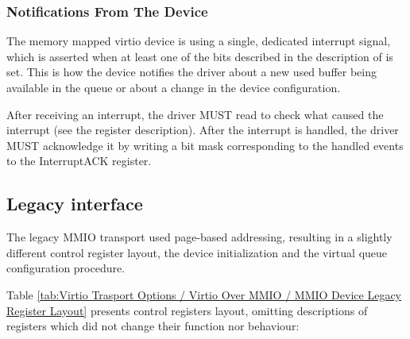 \subsubsection{Notifications From The Device}\label{sec:Virtio Transport Options / Virtio Over MMIO / MMIO-specific Initialization And Device Operation / Notifications From The Device}

The memory mapped virtio device is using a single, dedicated
interrupt signal, which is asserted when at least one of the
bits described in the description of 
is set. This is how the device notifies the
driver about a new used buffer being available in the queue
or about a change in the device configuration.

After receiving an interrupt, the driver MUST read
 to check what caused the interrupt
(see the register description). After the interrupt is handled,
the driver MUST acknowledge it by writing a bit mask
corresponding to the handled events to the InterruptACK register.

\subsection{Legacy interface}\label{sec:Virtio Transport Options / Virtio Over MMIO / Legacy interface}

The legacy MMIO transport used page-based addressing, resulting
in a slightly different control register layout, the device
initialization and the virtual queue configuration procedure.

Table \ref{tab:Virtio Trasport Options / Virtio Over MMIO / MMIO Device Legacy Register Layout} 
presents control registers layout, omitting
descriptions of registers which did not change their function
nor behaviour:

